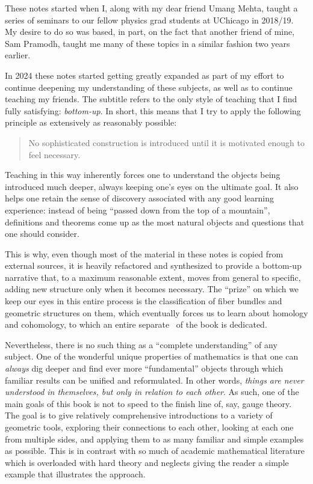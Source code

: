 
These notes started when I, along with my dear friend Umang Mehta, taught a series of seminars to our fellow physics grad students at UChicago in 2018/19. My desire to do so was based, in part, on the fact that another friend of mine, Sam Pramodh, taught me many of these topics in a similar fashion two years earlier.

In 2024 these notes started getting greatly expanded as part of my effort to continue deepening my understanding of these subjects, as well as to continue teaching my friends. The subtitle refers to the only style of teaching that I find fully satisfying: \emph{bottom-up}. In short, this means that I try to apply the following principle as extensively as reasonably possible:
\begin{quote}
    No sophisticated construction is introduced until it is motivated enough to feel necessary.
\end{quote}
Teaching in this way inherently forces one to understand the objects being introduced much deeper, always keeping one's eyes on the ultimate goal. It also helps one retain the sense of discovery associated with any good learning experience: instead of being ``passed down from the top of a mountain'', definitions and theorems come up as the most natural objects and questions that one should consider. 

This is why, even though most of the material in these notes is copied from external sources, it is heavily refactored and synthesized to provide a bottom-up narrative that, to a maximum reasonable extent, moves from general to specific, adding new structure only when it becomes necessary. The ``prize'' on which we keep our eyes in this entire process is the classification of fiber bundles and geometric structures on them, which eventually forces us to learn about homology and cohomology, to which an entire separate \partt\ of the book is dedicated. 

Nevertheless, there is no such thing as a ``complete understanding'' of any subject. One of the wonderful unique properties of mathematics is that one can \emph{always} dig deeper and find ever more ``fundamental'' objects through which familiar results can be unified and reformulated. In other words, \emph{things are never understood in themselves, but only in relation to each other}. As such, one of the main goals of this book is not to speed to the finish line of, say, gauge theory. The goal is to give relatively comprehensive introductions to a variety of geometric tools, exploring their connections to each other, looking at each one from multiple sides, and applying them to as many familiar and simple examples as possible. This is in contrast with so much of academic mathematical literature which is overloaded with hard theory and neglects giving the reader a simple example that illustrates the approach.


